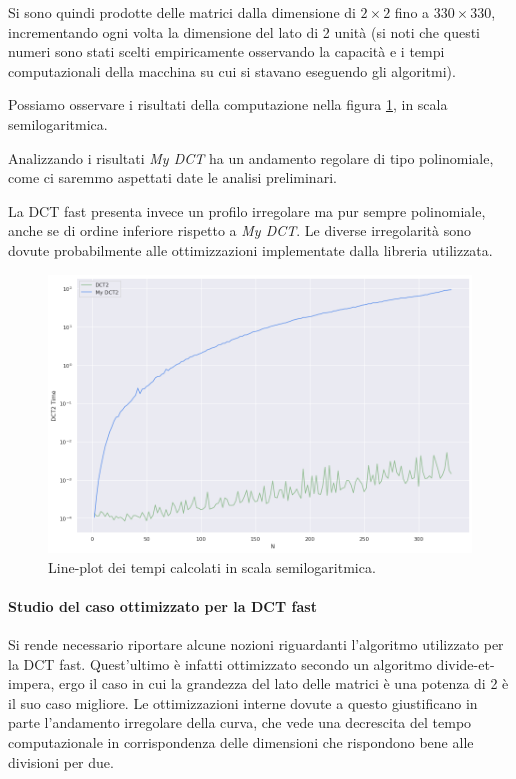 \documentclass[12pt]{article}
\begin{document}
Si sono quindi prodotte delle matrici dalla dimensione di $2 \times 2$ fino a $330 \times 330$, incrementando ogni volta la dimensione del lato di 2 unità (si noti che questi numeri sono stati scelti empiricamente osservando la capacità e i tempi computazionali della macchina su cui si stavano eseguendo gli algoritmi).

Possiamo osservare i risultati della computazione nella figura \ref{fig:2to330}, in scala semilogaritmica.

Analizzando i risultati \textit{My DCT} ha un andamento regolare di tipo polinomiale, come ci saremmo aspettati date le analisi preliminari.

La DCT fast presenta invece un profilo irregolare ma pur sempre polinomiale, anche se di ordine inferiore rispetto a \textit{My DCT}. Le diverse irregolarità sono dovute probabilmente alle ottimizzazioni implementate dalla libreria utilizzata.

\begin{figure}[!ht]
    \begin{center}
    \includegraphics[scale=0.5]{images/2to330.png}
    \caption{Line-plot dei tempi calcolati in scala semilogaritmica.}
    \label{fig:2to330}
    \end{center}
\end{figure}

\paragraph{Studio del caso ottimizzato per la DCT fast}
Si rende necessario riportare alcune nozioni riguardanti l'algoritmo utilizzato per la DCT fast.
Quest'ultimo è infatti ottimizzato secondo un algoritmo divide-et-impera, ergo il caso in cui la grandezza del lato delle matrici è una potenza di 2 è il suo caso migliore. Le ottimizzazioni interne dovute a questo giustificano in parte l'andamento irregolare della curva, che vede una decrescita del tempo computazionale in corrispondenza delle dimensioni che rispondono bene alle divisioni per due.
\end{document}

